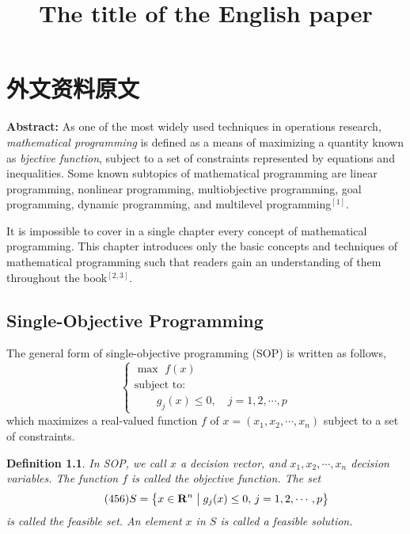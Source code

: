\chapter{外文资料原文}
\label{cha:engorg}

\title{The title of the English paper}

\textbf{Abstract:} As one of the most widely used techniques in operations
research, \emph{ mathematical programming} is defined as a means of maximizing a
quantity known as \emph{bjective function}, subject to a set of constraints
represented by equations and inequalities. Some known subtopics of mathematical
programming are linear programming, nonlinear programming, multiobjective
programming, goal programming, dynamic programming, and multilevel
programming$^{[1]}$.

It is impossible to cover in a single chapter every concept of mathematical
programming. This chapter introduces only the basic concepts and techniques of
mathematical programming such that readers gain an understanding of them
throughout the book$^{[2,3]}$.


\section{Single-Objective Programming}
The general form of single-objective programming (SOP) is written
as follows,
\begin{equation}\tag*{(123)} %
\left\{\begin{array}{l}
\max \,\,f(x)\\[0.1 cm]
\mbox{subject to:} \\ [0.1 cm]
\qquad g_j(x)\le 0,\quad j=1,2,\cdots,p
\end{array}\right.
\end{equation}
which maximizes a real-valued function $f$ of
$x=(x_1,x_2,\cdots,x_n)$ subject to a set of constraints.

\newcommand\Real{\mathbf{R}}
\newtheorem{mpdef}{Definition}[chapter]
\begin{mpdef}
In SOP, we call $x$ a decision vector, and
$x_1,x_2,\cdots,x_n$ decision variables. The function
$f$ is called the objective function. The set
\begin{equation}\tag*{(456)} %
S=\left\{x\in\Real^n\bigm|g_j(x)\le 0,\,j=1,2,\cdots,p\right\}
\end{equation}
is called the feasible set. An element $x$ in $S$ is called a
feasible solution.
\end{mpdef}

